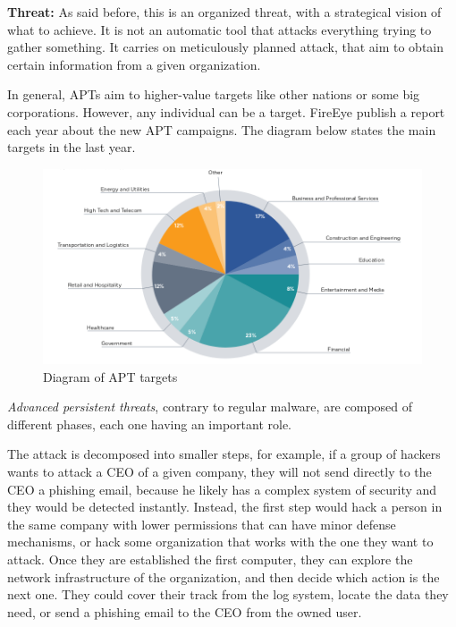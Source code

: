 \textbf{Threat:} As said before, this is an organized threat, with a strategical vision of what to achieve. It is not an automatic tool that attacks everything trying to gather something. It carries on meticulously planned attack, that aim to obtain certain information from a given organization. 

In general, APTs aim to higher-value targets like other nations or some big corporations. However, any individual can be a target. FireEye publish a report each year about the new APT campaigns. The diagram below states the main targets in the last year.\\

\begin{figure}[!h]
	\centering
	\includegraphics[width=1.0\columnwidth]{graph}
	\caption{Diagram of APT targets}
\end{figure}





\textit{Advanced persistent threats}, contrary to regular malware, are composed of different phases, each one having an important role. 

The attack is decomposed into smaller steps, for example, if a group of hackers wants to attack a CEO of a given company, they will not send directly to the CEO a phishing email, because he likely has a complex system of security and they would be detected instantly. 
Instead, the first step would hack a person in the same company with lower permissions that can have minor defense mechanisms, or hack some organization that works with the one they want to attack. Once they are established the first computer, they can explore the network infrastructure of the organization, and then decide which action is the next one.
They could cover their track from the log system, locate the data they need, or send a phishing email to the CEO from the owned user.

